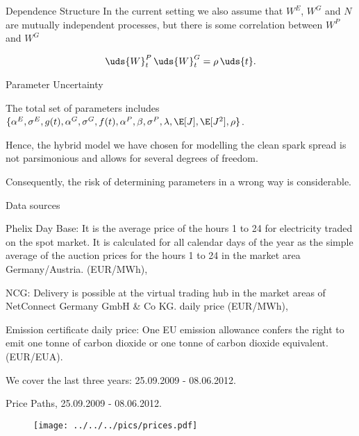 {Dependence Structure}
In the current setting we also assume that $W^E$, $W^G$ and $N$ are mutually independent processes, but there is some correlation between  $W^P$ and $W^G$

\begin{equation}
\uds{W}^P_t\,\uds{W}^G_t = \rho\,\uds{t}.
\label{corr}
\end{equation}

{Parameter Uncertainty}
\item The total set of parameters includes $\{\alpha^E, \sigma^E, g(t), \alpha^G, \sigma^G, f(t), \alpha^P, \beta, \sigma^P, \lambda, \E[J], \E[J^2], \rho\}$.
\item Hence, the hybrid model we have chosen for modelling the clean spark spread is not parsimonious and allows for several degrees of freedom.
\item Consequently, the risk of determining parameters in a wrong way is considerable.


{Data sources}
\item Phelix Day Base: It is the average price of the hours 1 to 24 for electricity traded on the spot market.
It is calculated for all calendar days of the year as the simple average of the auction prices for the
hours 1 to 24 in the market area Germany/Austria. (EUR/MWh),
\item NCG: Delivery is possible at the virtual trading hub in the market areas of
NetConnect Germany GmbH \& Co KG. daily price (EUR/MWh),
\item Emission certificate daily price: One EU emission allowance confers the right to emit one tonne of carbon dioxide or one tonne of
carbon dioxide equivalent. (EUR/EUA).
\item We cover the last three years: 25.09.2009 - 08.06.2012.

{Price Paths, 25.09.2009 - 08.06.2012.}
\begin{figure}[htp]
\centering
\texttt{[image: ../../../pics/prices.pdf]}
\label{prices}
\end{figure}


